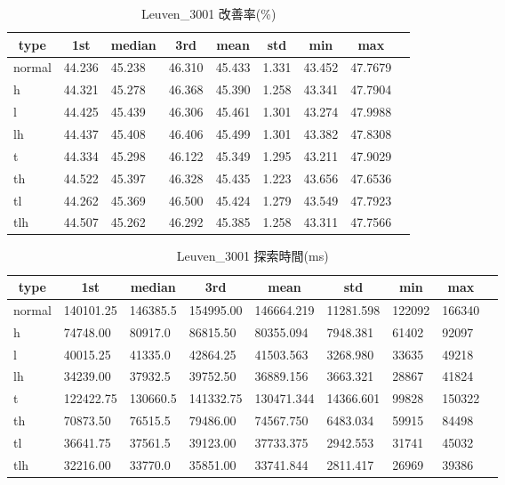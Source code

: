 \begin{table}[htbp]
    \caption{Leuven\_3001 改善率(\%)}
    \begin{tabular}{|l|l|l|l|l|l|l|l|l|}\hline
    \multicolumn{1}{|c|}{\textbf{type}}
    &\multicolumn{1}{|c|}{\textbf{1st}}
    &\multicolumn{1}{c|}{\textbf{median}}
    &\multicolumn{1}{c|}{\textbf{3rd}}
    &\multicolumn{1}{c|}{\textbf{mean}}
    &\multicolumn{1}{c|}{\textbf{std}}
    &\multicolumn{1}{c|}{\textbf{min}}
    &\multicolumn{1}{c|}{\textbf{max}}\\\hline
	normal & 44.236 & 45.238 & 46.310 & 45.433 & 1.331 & 43.452 & 47.7679\\\hline
	h & 44.321 & 45.278 & 46.368 & 45.390 & 1.258 & 43.341 & 47.7904\\\hline
	l & 44.425 & 45.439 & 46.306 & 45.461 & 1.301 & 43.274 & 47.9988\\\hline
	lh & 44.437 & 45.408 & 46.406 & 45.499 & 1.301 & 43.382 & 47.8308\\\hline
	t & 44.334 & 45.298 & 46.122 & 45.349 & 1.295 & 43.211 & 47.9029\\\hline
	th & 44.522 & 45.397 & 46.328 & 45.435 & 1.223 & 43.656 & 47.6536\\\hline
	tl & 44.262 & 45.369 & 46.500 & 45.424 & 1.279 & 43.549 & 47.7923\\\hline
	tlh & 44.507 & 45.262 & 46.292 & 45.385 & 1.258 & 43.311 & 47.7566\\\hline
	\end{tabular}
\end{table}
\begin{table}[htbp]
    \caption{Leuven\_3001 探索時間(ms)}
    \begin{tabular}{|l|l|l|l|l|l|l|l|l|}\hline
    \multicolumn{1}{|c|}{\textbf{type}}
    &\multicolumn{1}{|c|}{\textbf{1st}}
    &\multicolumn{1}{c|}{\textbf{median}}
    &\multicolumn{1}{c|}{\textbf{3rd}}
    &\multicolumn{1}{c|}{\textbf{mean}}
    &\multicolumn{1}{c|}{\textbf{std}}
    &\multicolumn{1}{c|}{\textbf{min}}
    &\multicolumn{1}{c|}{\textbf{max}}\\\hline
	normal & 140101.25 & 146385.5 & 154995.00 & 146664.219 & 11281.598 & 122092 & 166340\\\hline
	h & 74748.00 & 80917.0 & 86815.50 & 80355.094 & 7948.381 & 61402 & 92097\\\hline
	l & 40015.25 & 41335.0 & 42864.25 & 41503.563 & 3268.980 & 33635 & 49218\\\hline
	lh & 34239.00 & 37932.5 & 39752.50 & 36889.156 & 3663.321 & 28867 & 41824\\\hline
	t & 122422.75 & 130660.5 & 141332.75 & 130471.344 & 14366.601 & 99828 & 150322\\\hline
	th & 70873.50 & 76515.5 & 79486.00 & 74567.750 & 6483.034 & 59915 & 84498\\\hline
	tl & 36641.75 & 37561.5 & 39123.00 & 37733.375 & 2942.553 & 31741 & 45032\\\hline
	tlh & 32216.00 & 33770.0 & 35851.00 & 33741.844 & 2811.417 & 26969 & 39386\\\hline
	\end{tabular}
\end{table}
